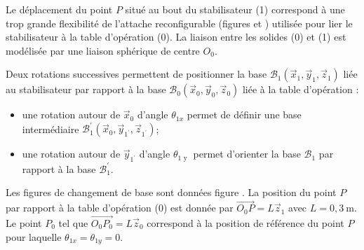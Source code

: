 Le déplacement du point $P$ situé au bout du stabilisateur (1) correspond à une trop grande flexibilité de l'attache reconfigurable (figures \label{fig_ccspsi2022:01} et \label{fig_ccspsi2022:02}) utilisée pour lier le stabilisateur à la table d'opération (0). La liaison entre les solides (0) et (1) est modélisée par une liaison sphérique de centre $O_{0}$.

Deux rotations successives permettent de positionner la base $\mathcal{B}_{1}\left(\vec{x}_{1}, \vec{y}_{1}, \vec{z}_{1}\right)$ liée au stabilisateur par rapport à la base $\mathcal{B}_{0}\left(\vec{x}_{0}, \vec{y}_{0}, \vec{z}_{0}\right)$ liée à la table d'opération :
\begin{itemize}
\item une rotation autour de $\vec{x}_{0}$ d'angle $\theta_{1 x}$ permet de définir une base intermédiaire $\mathcal{B}_{1}^{\prime}\left(\vec{x}_{0}, \vec{y}_{1^{\prime}}, \vec{z}_{1^{\prime}}\right)$;
\item une rotation autour de $\vec{y}_{1^{\prime}}$ d'angle $\theta_{1 \text { y }}$ permet d'orienter la base $\mathcal{B}_{1}$ par rapport à la base $\mathcal{B}_{1}^{\prime}$.
\end{itemize}

Les figures de changement de base sont données figure \label{fig_ccspsi2022:05}. La position du point $P$ par rapport à la table d'opération (0) est donnée par $\overrightarrow{O_{0} P}=L \vec{z}_{1}$ avec $L=0,3 \mathrm{~m}$. Le point $P_{0}$ tel que $\overrightarrow{O_{0} P_{0}}=L \vec{z}_{0}$ correspond à la position de référence du point $P$ pour laquelle $\theta_{1 x}=\theta_{1 y}=0$.





